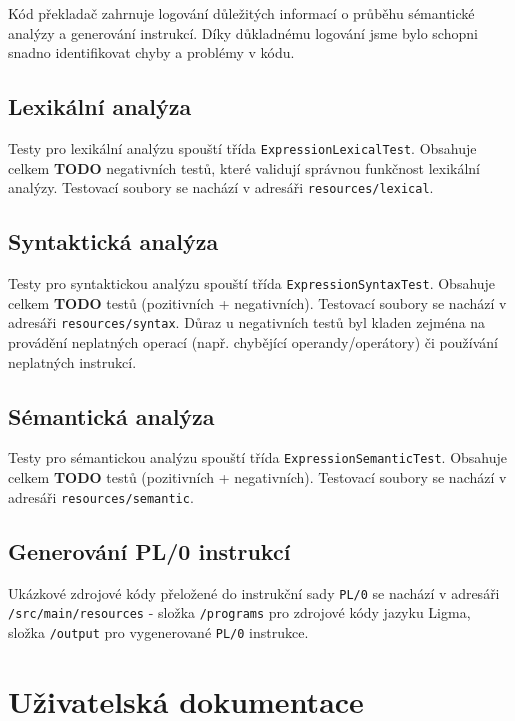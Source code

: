 \documentclass[czech, oth, kiv, he, iso690numb, viewonly]{fasthesis}
\begin{document}
    Kód překladač zahrnuje logování důležitých informací o průběhu sémantické analýzy a generování instrukcí.
    Díky důkladnému logování jsme bylo schopni snadno identifikovat chyby a problémy v kódu.

    \section{Lexikální analýza}

    Testy pro lexikální analýzu spouští třída \texttt{ExpressionLexicalTest}.
    Obsahuje celkem \textbf{TODO} negativních testů, které validují správnou funkčnost lexikální analýzy.
    Testovací soubory se nachází v adresáři \texttt{resources/lexical}.

    \section{Syntaktická analýza}

    Testy pro syntaktickou analýzu spouští třída \texttt{ExpressionSyntaxTest}.
    Obsahuje celkem \textbf{TODO} testů (pozitivních + negativních).
    Testovací soubory se nachází v adresáři \texttt{resources/syntax}.
    Důraz u negativních testů byl kladen zejména na provádění neplatných operací (např. chybějící operandy/operátory) či používání neplatných instrukcí.

    \section{Sémantická analýza}

    Testy pro sémantickou analýzu spouští třída \texttt{ExpressionSemanticTest}.
    Obsahuje celkem \textbf{TODO} testů (pozitivních + negativních).
    Testovací soubory se nachází v adresáři \texttt{resources/semantic}.

    \section{Generování PL/0 instrukcí}

    Ukázkové zdrojové kódy přeložené do instrukční sady \texttt{PL/0} se nachází v adresáři \texttt{/src/main/resources} - složka \texttt{/programs} pro zdrojové kódy jazyku Ligma, složka \texttt{/output} pro vygenerované \texttt{PL/0} instrukce.

    \chapter{Uživatelská dokumentace}
\end{document}
